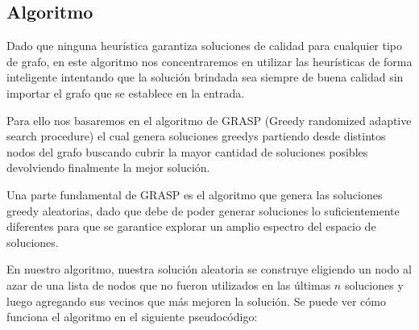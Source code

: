 \subsection{Algoritmo}
Dado que ninguna heurística garantiza soluciones de calidad para cualquier tipo de grafo, en este algoritmo nos concentraremos en utilizar las heurísticas de forma inteligente intentando que la solución brindada sea siempre de buena calidad sin importar el grafo que se establece en la entrada.

Para ello nos basaremos en el algoritmo de GRASP (Greedy randomized adaptive search procedure) el cual genera soluciones greedys partiendo desde distintos nodos del grafo buscando cubrir la mayor cantidad de soluciones posibles devolviendo finalmente la mejor solución.

Una parte fundamental de GRASP es el algoritmo que genera las soluciones greedy aleatorias, dado que debe de poder generar soluciones lo suficientemente diferentes para que se garantice explorar un amplio espectro del espacio de soluciones.

En nuestro algoritmo, nuestra solución aleatoria se construye eligiendo un nodo al azar de una lista de nodos que no fueron utilizados en las últimas $n$ soluciones y luego agregando sus vecinos que más mejoren la solución. Se puede ver cómo funciona el algoritmo en el siguiente pseudocódigo:

